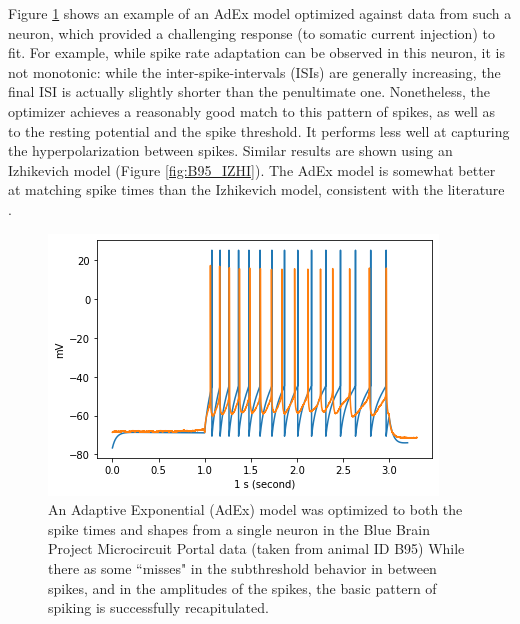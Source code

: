 Figure \ref{fig:B95Adexp} shows an example of an AdEx model optimized against data from such a neuron, which provided a challenging response (to somatic current injection) to fit.
For example, while spike rate adaptation can be observed in this neuron, it is not monotonic: while the inter-spike-intervals (ISIs) are generally increasing, the final ISI is actually slightly shorter than the penultimate one.
Nonetheless, the optimizer achieves a reasonably good match to this pattern of spikes, as well as to the resting potential and the spike threshold.
It performs less well at capturing the hyperpolarization between spikes.
Similar results are shown using an Izhikevich model (Figure \ref{fig:B95_IZHI}).
The AdEx model is somewhat better at matching spike times than the Izhikevich model, consistent with the literature \cite{rossant2011fitting}. 

\begin{figure}
    \centering
    \includegraphics[scale=0.75]{figures/bbp_multispiking_fit.png}
    \caption[Optimized AdEx model from BBP]{An Adaptive Exponential (AdEx) model was optimized to both the spike times and shapes from a single neuron in the Blue Brain Project Microcircuit Portal data (taken from animal ID B95)
    While there as some ``misses" in the subthreshold behavior in between spikes, and in the amplitudes of the spikes, the basic pattern of spiking is successfully recapitulated.}
    \label{fig:B95Adexp}
\end{figure}

